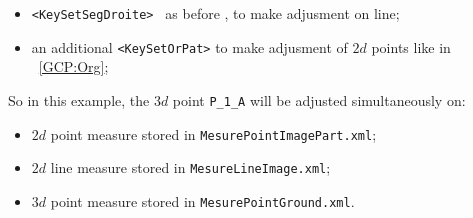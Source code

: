 \begin{itemize}
   \item  {\tt <KeySetSegDroite> } as before , to make adjusment on line;
   \item an additional {\tt  <KeySetOrPat>} to make adjusment of $2d$ points like in  ~\ref{GCP:Org};
   
\end{itemize}

So in this example, the $3d$ point {\tt P\_1\_A} will be adjusted simultaneously on:

\begin{itemize}
    \item $2d$ point measure stored in {\tt MesurePointImagePart.xml};
    \item $2d$ line measure stored in {\tt MesureLineImage.xml};
    \item $3d$ point measure stored in {\tt MesurePointGround.xml}.
\end{itemize}

 























